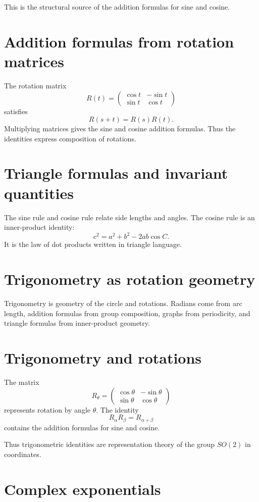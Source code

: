 This is the structural source of the addition formulas for sine and cosine.

\section{Addition formulas from rotation matrices}

The rotation matrix
\[
  R(t)=\begin{pmatrix}\cos t&-\sin t\\\sin t&\cos t\end{pmatrix}
\]
satisfies
\[
  R(s+t)=R(s)R(t).
\]
Multiplying matrices gives the sine and cosine addition formulas.  Thus the identities express composition of rotations.

\section{Triangle formulas and invariant quantities}

The sine rule and cosine rule relate side lengths and angles.  The cosine rule is an inner-product identity:
\[
  c^2=a^2+b^2-2ab\cos C.
\]
It is the law of dot products written in triangle language.

\section{Trigonometry as rotation geometry}

Trigonometry is geometry of the circle and rotations.  Radians come from arc length, addition formulas from group composition, graphs from periodicity, and triangle formulas from inner-product geometry.

\section{Trigonometry and rotations}

The matrix
\[
  R_\theta=\begin{pmatrix}\cos\theta&-\sin\theta\\\sin\theta&\cos\theta\end{pmatrix}
\]
represents rotation by angle $\theta$.  The identity
\[
  R_\alpha R_\beta=R_{\alpha+\beta}
\]
contains the addition formulas for sine and cosine.

Thus trigonometric identities are representation theory of the group $SO(2)$ in coordinates.

\section{Complex exponentials}

